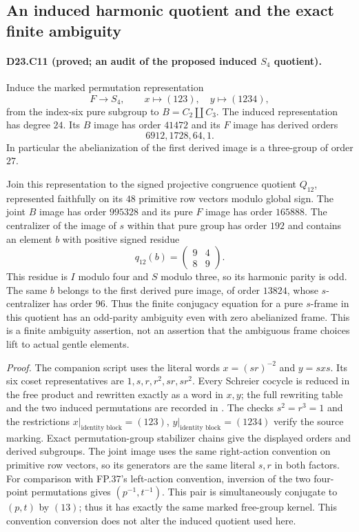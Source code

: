 
\subsection{An induced harmonic quotient and the exact finite ambiguity}

\paragraph{D23.C11 (proved; an audit of the proposed induced $S_4$ quotient).}
Induce the marked permutation representation
\[
 F\longrightarrow S_4,\qquad x\longmapsto(123),\quad
 y\longmapsto(1234),
\]
from the index-six pure subgroup to $B=C_2\amalg C_3$.
The induced representation has degree $24$.  Its $B$ image has
order $41472$ and its $F$ image has derived orders
\[
 6912,1728,64,1.
\]
In particular the abelianization of the first derived image is
a three-group of order $27$.

Join this representation to the signed projective congruence quotient
$Q_{12}$, represented faithfully on its $48$ primitive row vectors
modulo global sign.  The joint $B$ image has order $995328$ and
its pure $F$ image has order $165888$.  The centralizer of the
image of $s$ within that pure group has order $192$ and contains
an element $b$ with positive signed residue
\[
 q_{12}(b)=\begin{pmatrix}9&4\\8&9\end{pmatrix}.
\]
This residue is $I$ modulo four and $S$ modulo three, so its
harmonic parity is odd.  The same $b$ belongs to the first derived
pure image, of order $13824$, whose $s$-centralizer has order $96$.
Thus the finite conjugacy equation for a pure $s$-frame in this
quotient has an odd-parity ambiguity even with zero abelianized
frame.  This is a finite ambiguity assertion, not an assertion
that the ambiguous frame choices lift to actual gentle elements.

\emph{Proof.}
The companion script 
uses the literal words
$x=(sr)^{-2}$ and $y=sxs$.  Its six coset representatives are
$1,s,r,r^2,sr,sr^2$.  Every Schreier cocycle is reduced in the
free product and rewritten exactly as a word in $x,y$; the full
rewriting table and the two induced permutations are recorded in
.
The checks $s^2=r^3=1$ and the restrictions
$x|_{\text{identity block}}=(123)$,
$y|_{\text{identity block}}=(1234)$ verify the source marking.
Exact permutation-group stabilizer chains give the displayed orders
and derived subgroups.  The joint image uses the same right-action
convention on primitive row vectors, so its generators are the
same literal $s,r$ in both factors.
For comparison with FP.37's left-action convention, inversion of
the two four-point permutations gives $(p^{-1},t^{-1})$.
This pair is simultaneously conjugate to $(p,t)$ by $(13)$;
thus it has exactly the same marked free-group kernel.  This
convention conversion does not alter the induced quotient used here.

